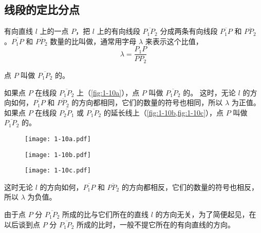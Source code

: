 \subsection{线段的定比分点}
有向直线 $l$ 上的一点 $P$，把 $l$ 上的有向线段 $\overline{P_1P_2}$ 分成两条有向线段 $\overline{P_1P}$ 和 $\overline{PP_2}$。$\overline{P_1P}$ 和 $\overline{PP_2}$ 数量的比叫做，通常用字母 $\lambda$ 来表示这个比值，
\[ \lambda = \frac{P_1P}{PP_2} \]

点 $P$ 叫做 $\overline{P_1P_2}$ 的。

如果点 $P$ 在线段 $\overline{P_1P_2}$ 上（\cref{fig:1-10a}），点 \(P\) 叫做 \(\overline{{P}_{1}{P}_{2}}\) 的。
这时，无论 $l$ 的方向如何，$\overline{P_1P}$ 和 $\overline{PP_2}$ 的方向都相同，它们的数量的符号也相同，所以 $\lambda$ 为正值。
如果点 $P$ 在线段 $\overline{P_2P_1}$ 或 $\overline{P_1P_2}$ 的延长线上（\cref{fig:1-10b,fig:1-10c}），点 $P$ 叫做 $\overline{P_1P_2}$ 的。
\begin{figure}
  \begin{minipage}{0.1\linewidth}
    \subcaption{}\label{fig:1-10a}
  \end{minipage}%
  \begin{minipage}{0.5\linewidth}
    \texttt{[image: 1-10a.pdf]}
  \end{minipage}\par
  \begin{minipage}{0.1\linewidth}
    \subcaption{}\label{fig:1-10b}
  \end{minipage}%
  \begin{minipage}{0.5\linewidth}
    \texttt{[image: 1-10b.pdf]}
  \end{minipage}\par
  \begin{minipage}{0.1\linewidth}
    \subcaption{}\label{fig:1-10c}
  \end{minipage}%
  \begin{minipage}{0.5\linewidth}
    \texttt{[image: 1-10c.pdf]}
  \end{minipage}
  \caption{}\label{fig:1-10}
\end{figure}
这时无论 $l$ 的方向如何，$\overline{P_1P}$ 和 $\overline{PP_2}$ 的方向都相反，它们的数量的符号也相反，所以 $\lambda$ 为负值。

由于点 $P$ 分 $\overline{P_1P_2}$ 所成的比与它们所在的直线 $l$ 的方向无关，为了简便起见，在以后谈到点 $P$ 分 $\overline{P_1P_2}$ 所成的比时，一般不提它所在的有向直线的方向。

